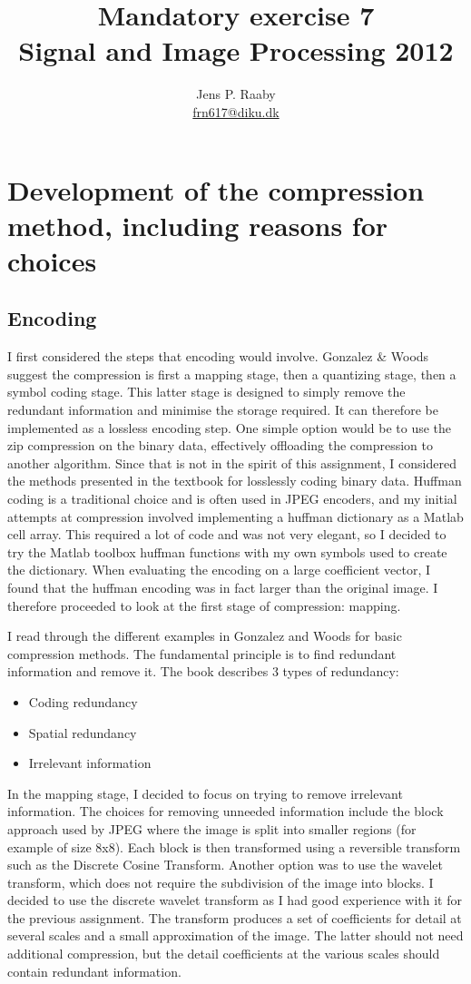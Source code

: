 \documentclass[a4paper]{article}
\title{Mandatory exercise 7 \\
Signal and Image Processing 2012}
\author{Jens P. Raaby \\
\url{frn617@diku.dk}}
\begin{document}
 
\maketitle

\section{Development of the compression method, including reasons for choices}
\subsection{Encoding}
I first considered the steps that encoding would involve. Gonzalez \& Woods suggest the compression is first a mapping stage, then a quantizing stage, then a symbol coding stage. This latter stage is designed to simply remove the redundant information and minimise the storage required. It can therefore be implemented as a lossless encoding step. One simple option would be to use the zip compression on the binary data, effectively offloading the compression to another algorithm. Since that is not in the spirit of this assignment, I considered the methods presented in the textbook for losslessly coding binary data. Huffman coding is a traditional choice and is often used in JPEG encoders, and my initial attempts at compression involved implementing a huffman dictionary as a Matlab cell array. This required a lot of code and was not very elegant, so I decided to try the Matlab toolbox huffman functions with my own symbols used to create the dictionary. When evaluating the encoding on a large coefficient vector, I found that the huffman encoding was in fact larger than the original image. I therefore proceeded to look at the first stage of compression: mapping.

I read through the different examples in Gonzalez and Woods for basic compression methods. The fundamental principle is to find redundant information and remove it. The book describes 3 types of redundancy:
\begin{itemize}

    \item Coding redundancy


    \item Spatial redundancy


    \item Irrelevant information
\end{itemize}
In the mapping stage, I decided to focus on trying to remove irrelevant information. The choices for removing unneeded information include the block approach used by JPEG where the image is split into smaller regions (for example of size 8x8). Each block is then transformed using a reversible transform such as the Discrete Cosine Transform. Another option was to use the wavelet transform, which does not require the subdivision of the image into blocks.
I decided to use the discrete wavelet transform as I had good experience with it for the previous assignment. The transform produces a set of coefficients for detail at several scales and a small approximation of the image. The latter should not need additional compression, but the detail coefficients at the various scales should contain redundant information.
\end{document}
